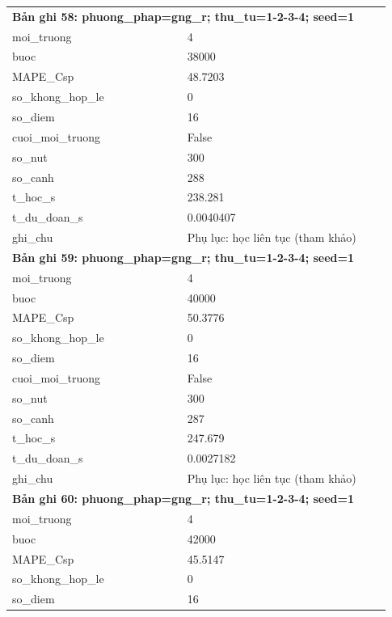 \begin{longtable}{p{0.43\linewidth}p{0.50\linewidth}}
\midrule
\multicolumn{2}{p{0.95\linewidth}}{\textbf{Bản ghi 58: phuong\_phap=gng\_r; thu\_tu=1-2-3-4; seed=1}} \\
moi\_\allowbreak truong & 4 \\
buoc & 38000 \\
MAPE\_\allowbreak Csp & 48.7203 \\
so\_\allowbreak khong\_\allowbreak hop\_\allowbreak le & 0 \\
so\_\allowbreak diem & 16 \\
cuoi\_\allowbreak moi\_\allowbreak truong & False \\
so\_\allowbreak nut & 300 \\
so\_\allowbreak canh & 288 \\
t\_\allowbreak hoc\_\allowbreak s & 238.281 \\
t\_\allowbreak du\_\allowbreak doan\_\allowbreak s & 0.0040407 \\
ghi\_\allowbreak chu & Phụ lục: học liên tục (tham khảo) \\
\midrule
\multicolumn{2}{p{0.95\linewidth}}{\textbf{Bản ghi 59: phuong\_phap=gng\_r; thu\_tu=1-2-3-4; seed=1}} \\
moi\_\allowbreak truong & 4 \\
buoc & 40000 \\
MAPE\_\allowbreak Csp & 50.3776 \\
so\_\allowbreak khong\_\allowbreak hop\_\allowbreak le & 0 \\
so\_\allowbreak diem & 16 \\
cuoi\_\allowbreak moi\_\allowbreak truong & False \\
so\_\allowbreak nut & 300 \\
so\_\allowbreak canh & 287 \\
t\_\allowbreak hoc\_\allowbreak s & 247.679 \\
t\_\allowbreak du\_\allowbreak doan\_\allowbreak s & 0.0027182 \\
ghi\_\allowbreak chu & Phụ lục: học liên tục (tham khảo) \\
\midrule
\multicolumn{2}{p{0.95\linewidth}}{\textbf{Bản ghi 60: phuong\_phap=gng\_r; thu\_tu=1-2-3-4; seed=1}} \\
moi\_\allowbreak truong & 4 \\
buoc & 42000 \\
MAPE\_\allowbreak Csp & 45.5147 \\
so\_\allowbreak khong\_\allowbreak hop\_\allowbreak le & 0 \\
so\_\allowbreak diem & 16 \\

\end{longtable}
